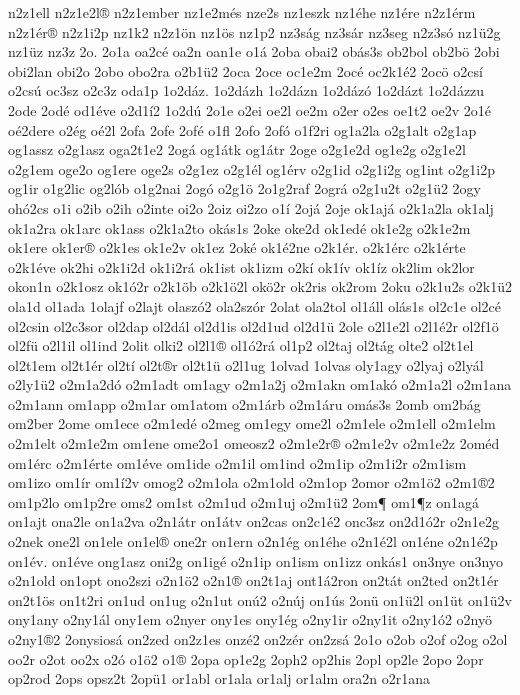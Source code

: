 {n2z1ell
n2z1e2l®
n2z1ember
nz1e2més
nze2s
nz1eszk
nz1éhe
nz1ére
n2z1érm
n2z1ér®
n2z1i2p
nz1k2
n2z1ön
nz1ös
nz1p2
nz3ság
nz3sár
nz3seg
n2z3só
nz1ü2g
nz1üz
nz3z
2o.
2o1a
oa2cé
oa2n
oan1e
o1á
2oba
obai2
obás3s
ob2bol
ob2bö
2obi
obi2lan
obi2o
2obo
obo2ra
o2b1ü2
2oca
2oce
oc1e2m
2océ
oc2k1é2
2ocö
o2csí
o2csú
oc3sz
o2c3z
oda1p
1o2dáz.
1o2dázh
1o2dázn
1o2dázó
1o2dázt
1o2dázzu
2ode
2odé
od1éve
o2d1í2
1o2dú
2o1e
o2ei
oe2l
oe2m
o2er
o2es
oe1t2
oe2v
2o1é
oé2dere
o2ég
oé2l
2ofa
2ofe
2ofé
o1fl
2ofo
2ofó
o1f2ri
og1a2la
o2g1alt
o2g1ap
og1assz
o2g1asz
oga2t1e2
2ogá
og1átk
og1átr
2oge
o2g1e2d
og1e2g
o2g1e2l
o2g1em
oge2o
og1ere
oge2s
o2g1ez
o2g1él
og1érv
o2g1id
o2g1i2g
og1int
o2g1i2p
og1ir
o1g2lic
og2lób
o1g2nai
2ogó
o2g1ö
2o1g2raf
2ográ
o2g1u2t
o2g1ü2
2ogy
ohó2cs
o1i
o2ib
o2ih
o2inte
oi2o
2oiz
oi2zo
o1í
2ojá
2oje
ok1ajá
o2k1a2la
ok1alj
ok1a2ra
ok1arc
ok1ass
o2k1a2to
okás1s
2oke
oke2d
ok1edé
ok1e2g
o2k1e2m
ok1ere
ok1er®
o2k1es
ok1e2v
ok1ez
2oké
ok1é2ne
o2k1ér.
o2k1érc
o2k1érte
o2k1éve
ok2hi
o2k1i2d
ok1i2rá
ok1ist
ok1izm
o2kí
ok1ív
ok1íz
ok2lim
ok2lor
okon1n
o2k1osz
ok1ó2r
o2k1öb
o2k1ö2l
okö2r
ok2ris
ok2rom
2oku
o2k1u2s
o2k1ü2
ola1d
ol1ada
1olajf
o2lajt
olaszó2
ola2szór
2olat
ola2tol
ol1áll
olás1s
ol2c1e
ol2cé
ol2csin
ol2c3sor
ol2dap
ol2dál
ol2d1is
ol2d1ud
ol2d1ü
2ole
o2l1e2l
o2l1é2r
ol2f1ö
ol2fü
o2l1il
ol1ind
2olit
olki2
ol2l1®
ol1ó2rá
ol1p2
ol2taj
ol2tág
olte2
ol2t1el
ol2t1em
ol2t1ér
ol2tí
ol2t®r
ol2t1ü
o2l1ug
1olvad
1olvas
oly1agy
o2lyaj
o2lyál
o2ly1ü2
o2m1a2dó
o2m1adt
om1agy
o2m1a2j
o2m1akn
om1akó
o2m1a2l
o2m1ana
o2m1ann
om1app
o2m1ar
om1atom
o2m1árb
o2m1áru
omás3s
2omb
om2bág
om2ber
2ome
om1ece
o2m1edé
o2meg
om1egy
ome2l
o2m1ele
o2m1ell
o2m1elm
o2m1elt
o2m1e2m
om1ene
ome2o1
omeosz2
o2m1e2r®
o2m1e2v
o2m1e2z
2oméd
om1érc
o2m1érte
om1éve
om1ide
o2m1il
om1ind
o2m1ip
o2m1i2r
o2m1ism
om1izo
om1ír
om1í2v
omog2
o2m1ola
o2m1old
o2m1op
2omor
o2m1ö2
o2m1®2
om1p2lo
om1p2re
oms2
om1st
o2m1ud
o2m1uj
o2m1ü2
2om¶
om1¶z
on1agá
on1ajt
ona2le
on1a2va
o2n1átr
on1átv
on2cas
on2c1é2
onc3sz
on2d1ó2r
o2n1e2g
o2nek
one2l
on1ele
on1el®
one2r
on1ern
o2n1ég
on1éhe
o2n1é2l
on1éne
o2n1é2p
on1év.
on1éve
ong1asz
oni2g
on1igé
o2n1ip
on1ism
on1izz
onkás1
on3nye
on3nyo
o2n1old
on1opt
ono2szi
o2n1ö2
o2n1®
on2t1aj
ont1á2ron
on2tát
on2ted
on2t1ér
on2t1ös
on1t2ri
on1ud
on1ug
o2n1ut
onú2
o2núj
on1ús
2onü
on1ü2l
on1üt
on1ü2v
ony1any
o2ny1ál
ony1em
o2nyer
ony1es
ony1ég
o2ny1ir
o2ny1it
o2ny1ó2
o2nyö
o2ny1®2
2onysiosá
on2zed
on2z1es
onzé2
on2zér
on2zsá
2o1o
o2ob
o2of
o2og
o2ol
oo2r
o2ot
oo2x
o2ó
o1ö2
o1®
2opa
op1e2g
2oph2
op2his
2opl
op2le
2opo
2opr
op2rod
2ops
opsz2t
2opü1
or1abl
or1ala
or1alj
or1alm
ora2n
o2r1ana
}
